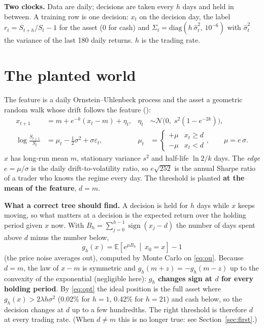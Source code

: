 \documentclass[11pt,a4paper]{article}
\newcommand{\code}[1]{\texttt{\detokenize{#1}}}
\newcommand{\E}{\mathbb{E}}
\newcommand{\1}{\mathbf{1}}
\begin{document}
\textbf{Two clocks.} Data are daily; decisions are taken every $h$ days and held in between. A training row is one decision: $x_t$ on the decision day, the label $r_t=S_{t+h}/S_t-1$ for the asset (0 for cash) and $\Sigma_t=\mathrm{diag}(h\,\hat\sigma_t^2,\,10^{-6})$ with $\hat\sigma_t^2$ the variance of the last 180 daily returns. $h$ is the trading rate.

\section{The planted world}\label{sec:world}
The feature is a daily Ornstein--Uhlenbeck process and the asset a geometric random walk whose drift follows the feature (\code{synthetic_data.py}):
\begin{align}
x_{t+1}&=m+e^{-k}(x_t-m)+\eta_t, & \eta_t&\sim\mathcal N\!\big(0,\;s^2(1-e^{-2k})\big),\label{eq:ou}\\
\log\frac{S_{t+1}}{S_t}&=\mu_t-\tfrac12\sigma^2+\sigma\varepsilon_t, & \mu_t&=\begin{cases}+\mu & x_t\ge d\\ -\mu & x_t<d\end{cases},\qquad \mu=e\,\sigma.\label{eq:price}
\end{align}
$x$ has long-run mean $m$, stationary variance $s^2$ and half-life $\ln2/k$ days. The \emph{edge} $e=\mu/\sigma$ is the daily drift-to-volatility ratio, so $e\sqrt{252}$ is the annual Sharpe ratio of a trader who knows the regime every day. The threshold is planted \textbf{at the mean of the feature}, $d=m$.

\textbf{What a correct tree should find.} A decision is held for $h$ days while $x$ keeps moving, so what matters at a decision is the expected return over the holding period given $x$ now. With $B_h=\sum_{j=0}^{h-1}\operatorname{sign}(x_j-d)$ the number of days spent above $d$ minus the number below,
\begin{equation}\label{eq:g}
g_h(x)=\E\!\left[e^{\mu B_h}\,\middle|\,x_0=x\right]-1
\end{equation}
(the price noise averages out), computed by Monte Carlo on \eqref{eq:ou}. Because $d=m$, the law of $x-m$ is symmetric and $g_h(m+z)=-g_h(m-z)$ up to the convexity of the exponential (negligible here): \textbf{$g_h$ changes sign at $d$ for every holding period}. By \eqref{eq:opt} the ideal position is the full asset where $g_h(x)>2\lambda h\sigma^2$ (0.02\% for $h=1$, 0.42\% for $h=21$) and cash below, so the decision changes at $d$ up to a few hundredths. The right threshold is therefore $d$ at every trading rate. (When $d\neq m$ this is no longer true: see Section~\ref{sec:first}.)
\end{document}
